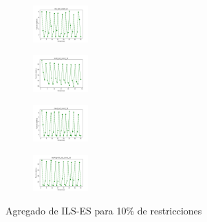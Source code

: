 \begin{figure}[H]
\begin{subfigure}
    \end{subfigure}
    \hfill
    \begin{subfigure}
        \centering
        \includegraphics[width=0.234\textwidth]{img/ils-es/iris_set_const_10_3773969821_cost.png}
    \end{subfigure}
    \hfill
    \begin{subfigure}
        \centering
        \includegraphics[width=0.234\textwidth]{img/ils-es/ecoli_set_const_10_3773969821_cost.png}
    \end{subfigure}
    \hfill
    \begin{subfigure}
        \centering
        \includegraphics[width=0.234\textwidth]{img/ils-es/rand_set_const_10_3773969821_cost.png}
    \end{subfigure}
    \hfill
    \begin{subfigure}
        \centering
        \includegraphics[width=0.234\textwidth]{img/ils-es/newthyroid_set_const_10_3773969821_cost.png}
    \end{subfigure}
    \caption{Agregado de ILS-ES para 10\% de restricciones}
\end{figure}


\vspace*{\fill}
\newpage
\vspace*{\fill}

